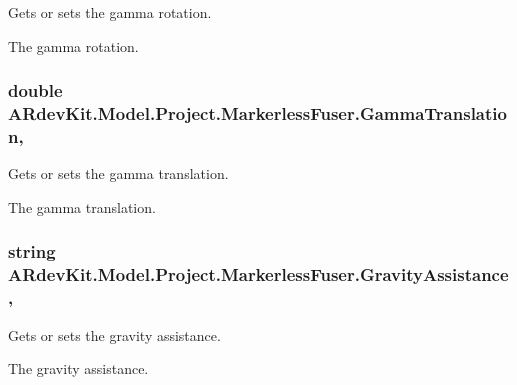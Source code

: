 Gets or sets the gamma rotation. 

The gamma rotation. \hypertarget{class_a_rdev_kit_1_1_model_1_1_project_1_1_markerless_fuser_ad092a956a7a5a982d478ec726d0dafe6}{
\subsubsection[{Gamma\-Translation}]{\setlength{\rightskip}{0pt plus 5cm}double A\-Rdev\-Kit.\-Model.\-Project.\-Markerless\-Fuser.\-Gamma\-Translation\hspace{0.3cm}{\ttfamily [get]}, {\ttfamily [set]}}}\label{class_a_rdev_kit_1_1_model_1_1_project_1_1_markerless_fuser_ad092a956a7a5a982d478ec726d0dafe6}


Gets or sets the gamma translation. 

The gamma translation. \hypertarget{class_a_rdev_kit_1_1_model_1_1_project_1_1_markerless_fuser_a6a2e22d44700a4d393b8f4e5f0d9a67e}{
\subsubsection[{Gravity\-Assistance}]{\setlength{\rightskip}{0pt plus 5cm}string A\-Rdev\-Kit.\-Model.\-Project.\-Markerless\-Fuser.\-Gravity\-Assistance\hspace{0.3cm}{\ttfamily [get]}, {\ttfamily [set]}}}\label{class_a_rdev_kit_1_1_model_1_1_project_1_1_markerless_fuser_a6a2e22d44700a4d393b8f4e5f0d9a67e}


Gets or sets the gravity assistance. 

The gravity assistance. 